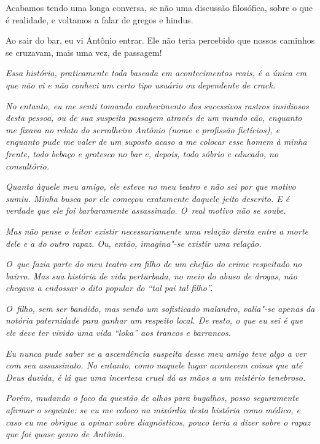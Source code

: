 Acabamos tendo uma longa conversa, se não uma discussão filosófica, sobre
o que é realidade, e voltamos a falar de gregos e hindus.

Ao sair do bar, eu vi Antônio entrar. Ele não teria percebido que nossos
caminhos se cruzavam, mais uma vez, de passagem!

\begin{center}\asterisc{}\end{center}
\begingroup\small

\emph{Essa história, praticamente toda baseada em acontecimentos reais, é a
única em que não vi e não conheci um certo tipo usuário ou dependente de
crack.}

\emph{No entanto, eu me senti tomando conhecimento dos sucessivos
rastros insidiosos desta pessoa, ou de sua suspeita passagem através de
um mundo cão, enquanto me fixava no relato do serralheiro Antônio (nome
e profissão fictícios), e enquanto pude me valer de um suposto acaso a
me colocar esse homem à minha frente, todo bebaço e grotesco no bar e,
depois, todo sóbrio e educado, no consultório.}

\emph{Quanto àquele meu amigo, ele esteve no meu teatro e não sei por
que motivo sumiu. Minha busca por ele começou exatamente daquele jeito
descrito. E é verdade que ele foi barbaramente assassinado. O~real
motivo não se soube.}

\emph{Mas não pense o leitor existir necessariamente uma relação direta
entre a morte dele e a do outro rapaz. Ou, então, imagina"-se existir uma
relação.}

\emph{O~que fazia parte do meu teatro era filho de um chefão do crime
respeitado no bairro. Mas sua história de vida perturbada, no meio do
abuso de drogas, não chegava a endossar o dito popular do ``tal pai tal
filho''.}

\emph{O~filho, sem ser bandido, mas sendo um sofisticado malandro,
valia"-se apenas da notória paternidade para ganhar um respeito local. De
resto, o que eu sei é que ele deve ter vivido uma vida ``loka'' aos
trancos e barrancos.}

\emph{Eu nunca pude saber se a ascendência suspeita desse meu amigo teve
algo a ver com seu assassinato. No entanto, como naquele lugar acontecem
coisas que até Deus duvida, é lá que uma incerteza cruel dá as mãos a um
mistério tenebroso.}

\emph{Porém, mudando o foco da questão de alhos para bugalhos, posso
seguramente afirmar o seguinte: se eu me coloco na mixórdia desta
história como médico, e caso eu me obrigue a opinar sobre diagnósticos,
pouco teria a dizer sobre o rapaz que foi quase genro de Antônio.}

